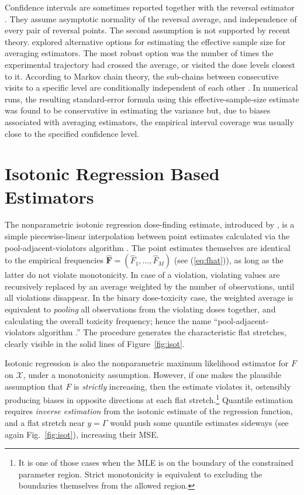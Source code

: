 Confidence intervals are sometimes reported together with the reversal estimator \citep{Capo:Parp:Lyon:Colu:Cell:Mini:2001,Camo:Capo:Lyon:Colu:Epid:2004}. They assume asymptotic normality of the reversal average, and independence of every pair of reversal points.  The second assumption is not supported by recent theory. \cite{Oron07} explored alternative options for estimating the effective sample size for averaging estimators. The most robust option was the number of times the experimental trajectory had crossed the average, or visited the dose levels closest to it. According to Markov chain theory, the sub-chains between consecutive visits to a specific level are conditionally independent of each other \citep{Tsut:rand:1967}. In numerical runs, the resulting standard-error formula using this effective-sample-size estimate was found to be conservative in estimating the variance but, due to biases associated with averaging estimators, the empirical interval coverage was usually close to the specified confidence level.

\section{Isotonic Regression Based Estimators}



The nonparametric isotonic regression dose-finding estimate, introduced by \cite{Styl:Flou:dose:2002}, is a simple piecewise-linear interpolation between point estimates calculated via the pool-adjacent-violators algorithm \citep[PAVA,][]{BBBB:order:1972}. The point estimates themselves are identical to the empirical frequencies $\mathbf{\hat{F}}=\left(\hat{F}_1,\ldots,\hat{F}_M\right)$ (see (\ref{eq:fhat})), as long as the latter do not violate monotonicity. In case of a violation, violating values are recursively replaced by an average weighted by the number of observations, until all violations disappear. In the binary dose-toxicity case, the weighted average is equivalent to \emph{pooling} all observations from the violating doses together, and calculating the overall toxicity frequency; hence the name ``pool-adjacent-violators algorithm .'' The procedure generates the characteristic flat stretches, clearly visible in the solid lines of Figure~\ref{fig:isot}.

 Isotonic regression is also the nonparametric maximum likelihood estimator for $F$ on $\mathcal{X}$, under a monotonicity assumption. However, if one makes the plausible assumption that $F$ is \emph{strictly} increasing, then the estimate violates it, ostensibly producing biases in opposite directions at each flat stretch.\footnote{It is one of those cases when the MLE is on the boundary of the constrained parameter region. Strict monotonicity is equivalent to excluding the boundaries themselves from the allowed region.} Quantile estimation requires \emph{inverse estimation} from the isotonic estimate of the regression function, and a flat stretch near $y=\Gamma$ would push some quantile estimates sideways (see again Fig.~\ref{fig:isot}), increasing their MSE.

